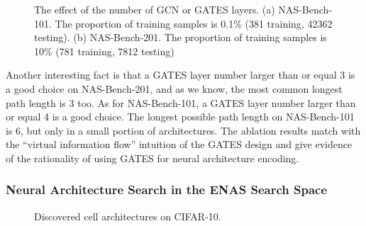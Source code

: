 \documentclass[runningheads]{llncs}
\begin{document}
\begin{figure*}[tb]
\begin{center}
  \caption{The  effect of the number of GCN or GATES layers. (a) NAS-Bench-101. The proportion of training samples is 0.1\% (381 training, 42362 testing). (b) NAS-Bench-201. The proportion of training samples is 10\% (781 training, 7812 testing)}
  \label{fig:gates_layers}
\end{center}

\end{figure*}

Another interesting fact is that
a GATES layer number larger than or equal 3 is a good choice on NAS-Bench-201, and as we know, the most common longest path length is 3 too. 
As for NAS-Bench-101, a GATES layer number larger than or equal 4  is a good choice. The longest possible path length on NAS-Bench-101 is 6, but only in a small portion of architectures.
The ablation results match with the ``virtual information flow'' intuition of the GATES design and give evidence of the rationality of using GATES for neural architecture encoding.


\subsubsection{Neural Architecture Search in the ENAS Search Space}
\begin{figure}[tb]
  \begin{center}
    \caption{Discovered cell architectures on CIFAR-10.}
    \label{fig:enas_discover_cell}
  \end{center}
\end{figure}
\end{document}
